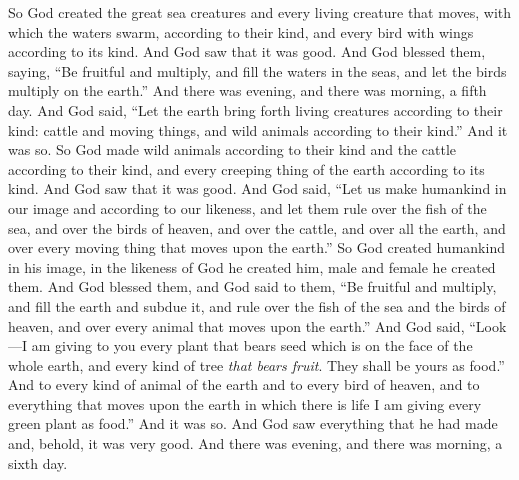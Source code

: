 \begin{biblechapter}
\verse So God created the great sea creatures and every living creature that moves, with which the waters swarm, according to their kind, and every bird with wings according to its kind. And God saw that it was good.
\verse And God blessed them, saying, “Be fruitful and multiply, and fill the waters in the seas, and let the birds multiply on the earth.”
\verse And there was evening, and there was morning, a fifth day.
\verse And God said, “Let the earth bring forth living creatures according to their kind: cattle and moving things, and wild animals according to their kind.” And it was so.
\verse So God made wild animals according to their kind and the cattle according to their kind, and every creeping thing of the earth according to its kind. And God saw that it was good.
\verse And God said, “Let us make humankind in our image and according to our likeness, and let them rule over the fish of the sea, and over the birds of heaven, and over the cattle, and over all the earth, and over every moving thing that moves upon the earth.”
\verse So God created humankind in his image, in the likeness of God he created him, male and female he created them.
\verse And God blessed them, and God said to them, “Be fruitful and multiply, and fill the earth and subdue it, and rule over the fish of the sea and the birds of heaven, and over every animal that moves upon the earth.”
\verse And God said, “Look—I am giving to you every plant that bears seed which is on the face of the whole earth, and every kind of tree \textit{that bears fruit}. They shall be yours as food.”
\verse And to every kind of animal of the earth and to every bird of heaven, and to everything that moves upon the earth in which there is life I am giving every green plant as food.” And it was so.
\verse And God saw everything that he had made and, behold, it was very good. And there was evening, and there was morning, a sixth day.
\end{biblechapter}

